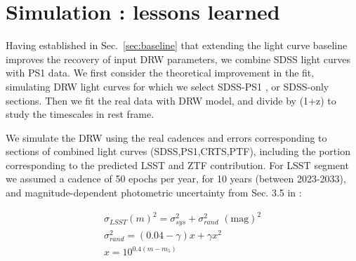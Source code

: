 \documentclass[twocolumn]{aastex62}
\begin{document}




\section{Simulation : lessons learned}\label{sec:simulation}

Having established in Sec.~\ref{sec:baseline} that extending the light curve baseline improves the recovery of input DRW parameters,  we combine SDSS light curves with PS1 data. We first consider the theoretical improvement in the fit, simulating DRW light curves for which we select SDSS-PS1 , or SDSS-only sections.  Then we fit the real data with DRW model, and divide by (1+z) to study the timescales in rest frame. 


We simulate the DRW using the real cadences and errors corresponding to sections of combined light curves (SDSS,PS1,CRTS,PTF), including the portion corresponding to the predicted LSST and ZTF contribution.  For LSST segment we assumed a cadence of 50 epochs per year,  for 10 years (between 2023-2033), and  magnitude-dependent photometric uncertainty from Sec. 3.5 in \citet{lsstscibook}:

\begin{eqnarray}
\sigma_{LSST}(m)^{2} = \sigma_{sys}^{2} + \sigma_{rand}^{2} \,\, \mathrm{(mag)}^{2}\\
\sigma_{rand}^{2} = (0.04-\gamma)x + \gamma x^{2} \\
x = 10^{0.4(m-m_{5})}
\end{eqnarray}
\end{document}
